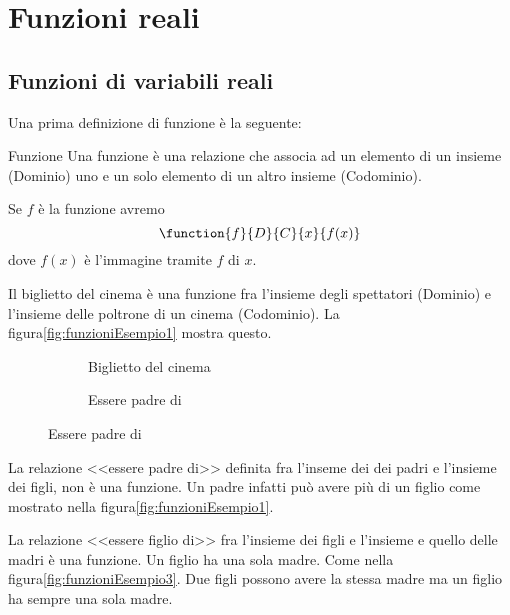 \chapter{Funzioni reali}
\label{cha:FunzioniEquazioniEsponenziali}
\section{Funzioni di variabili reali}
\label{sec:FunzioniVariabileReale}
Una prima definizione di funzione è la seguente:
\begin{definizionet}{Funzione}{}
Una funzione è una relazione che associa ad un elemento di un insieme (Dominio) uno e un solo elemento di un altro insieme (Codominio). 
\end{definizionet}
Se $f$ è la funzione avremo \[\function{f}{D}{C}{x}{f(x)}\]
dove $f(x)$ è l'immagine tramite $f$ di $x$.
\begin{osservazionet}{}{}
 Il biglietto del cinema è una funzione fra l'insieme degli spettatori (Dominio) e l'insieme delle poltrone di un cinema (Codominio). La figura\nobs\vref{fig:funzioniEsempio1} mostra questo. 
 \end{osservazionet}
\begin{figure}
	\centering
	\begin{subfigure}[b]{.4\linewidth}
		\centering
		
		\caption{Biglietto del cinema}
		\label{fig:funzioniEsempio1}
	\end{subfigure}\qquad
	\centering
		\begin{subfigure}[b]{.4\linewidth}
			\centering
			
			\caption{Essere padre di}
			\label{fig:funzioniEsempio2}
		\end{subfigure}%
\end{figure}
\begin{osservazionet}{}{}
La relazione <<essere padre di>> definita fra l'inseme dei dei padri e l'insieme dei figli, non è una funzione. Un padre infatti può avere più di un figlio come mostrato nella  figura\nobs\vref{fig:funzioniEsempio1}.
\end{osservazionet}
\begin{osservazionet}{}{}
La relazione <<essere figlio di>> fra l'insieme dei figli e l'insieme e quello delle madri è una funzione. Un figlio ha una sola madre. Come nella figura\nobs\vref{fig:funzioniEsempio3}. Due figli possono avere la stessa madre ma un figlio ha sempre una sola madre.
\end{osservazionet}
